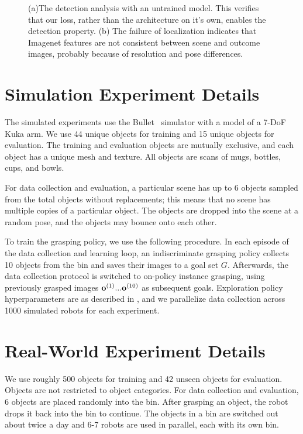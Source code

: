 \documentclass{article}
\begin{document}
\begin{figure}[h]
\centering
{}

\caption{(a)The detection analysis with an untrained model. This verifies that our loss, rather than the architecture on it's own, enables the detection property. (b) The failure of localization indicates that Imagenet features are not consistent between scene and outcome images, probably because of resolution and pose differences.}
\end{figure}

\section{Simulation Experiment Details}
The simulated experiments use the Bullet~\cite{bullet} simulator with a model of a 7-DoF Kuka arm. We use 44 unique objects for training and 15 unique objects for evaluation. The training and evaluation objects are mutually exclusive, and each object has a unique mesh and texture. All objects are scans of mugs, bottles, cups, and bowls.

For data collection and evaluation, a particular scene has up to 6 objects sampled from the total objects without replacements; this means that no scene has multiple copies of a particular object. The objects are dropped into the scene at a random pose, and the objects may bounce onto each other.

To train the grasping policy, we use the following procedure. In each episode of the data collection and learning loop, an indiscriminate grasping policy collects 10 objects from the bin and saves their images to a goal set \(G\). Afterwards, the data collection protocol is switched to on-policy instance grasping,
using previously grasped images $\mathbf{o}^{(1)}...\mathbf{o}^{(10)}$ as subsequent goals. Exploration policy hyperparameters are as described in \cite{qtopt2018}, and we parallelize data collection across 1000 simulated robots for each experiment.

\section{Real-World Experiment Details}
We use roughly 500 objects for training and 42 unseen objects for evaluation. Objects are not restricted to object categories. For data collection and evaluation, 6 objects are placed randomly into the bin. After grasping an object, the robot drops it back into the bin to continue. The objects in a bin are switched out about twice a day and 6-7 robots are used in parallel, each with its own bin.
\end{document}
